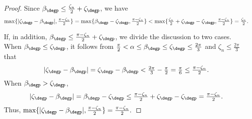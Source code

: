 \begin{proof}
    	Since $\beta_\degp \leq \tfrac{\zeta_n}{2} + \zeta_\degp$, we have
    	\[
    	\max\{|\zeta_\degp  - \beta_\degp |, \tfrac{\pi - \zeta_n}{2}\}
    	= \max\{\beta_\degp - \zeta_\degp, \tfrac{\pi - \zeta_n}{2}\}
    	< \max\{\tfrac{\zeta_n}{2}+\zeta_\degp - \zeta_\degp, \tfrac{\pi - \zeta_n}{2}\}
    	= \tfrac{\zeta_n}{2} .
    	\]
     
    	If, in addition, $\beta_\degp \leq \tfrac{\pi - \zeta_n}{2} + \zeta_\degp$, we divide the discussion to two cases.
    	When $\beta_\degp \leq \zeta_\degp$, it follows from $\tfrac{\pi}{2} < \alpha \leq \beta_\degp \leq \zeta_\degp  \leq \tfrac{2\pi}{3}$ and $\zeta_n \leq \tfrac{2\pi}{3}$ that
    	\[
    	|\zeta_\degp  - \beta_\degp |
    	= \zeta_\degp  - \beta_\degp
    	< \tfrac{2\pi}{3} - \tfrac{\pi}{2}
    	= \tfrac{\pi}{6}
    	\leq \tfrac{\pi - \zeta_n}{2}.
    	\]
    	When $\beta_\degp > \zeta_\degp$, 
    	\[
    	|\zeta_\degp  - \beta_\degp |
    	= \beta_\degp - \zeta_\degp
    	\leq \tfrac{\pi - \zeta_n}{2} + \zeta_\degp - \zeta_\degp
    	= \tfrac{\pi - \zeta_n}{2}.
    	\]
    	Thus, $\max\{|\zeta_\degp  - \beta_\degp |, \tfrac{\pi - \zeta_n}{2}\} = \tfrac{\pi - \zeta_n}{2}.$
\end{proof}